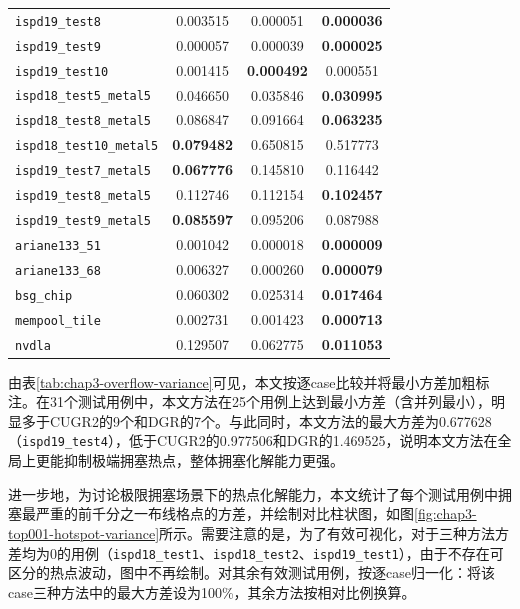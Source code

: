 \begin{table}[!htbp]
{\begin{tabular}{l c c c}
            \texttt{ispd19\_test8} & 0.003515 & 0.000051 & \textbf{0.000036} \\
            \texttt{ispd19\_test9} & 0.000057 & 0.000039 & \textbf{0.000025} \\
            \texttt{ispd19\_test10} & 0.001415 & \textbf{0.000492} & 0.000551 \\
            \texttt{ispd18\_test5\_metal5} & 0.046650 & 0.035846 & \textbf{0.030995} \\
            \texttt{ispd18\_test8\_metal5} & 0.086847 & 0.091664 & \textbf{0.063235} \\
            \texttt{ispd18\_test10\_metal5} & \textbf{0.079482} & 0.650815 & 0.517773 \\
            \texttt{ispd19\_test7\_metal5} & \textbf{0.067776} & 0.145810 & 0.116442 \\
            \texttt{ispd19\_test8\_metal5} & 0.112746 & 0.112154 & \textbf{0.102457} \\
            \texttt{ispd19\_test9\_metal5} & \textbf{0.085597} & 0.095206 & 0.087988 \\
            \texttt{ariane133\_51} & 0.001042 & 0.000018 & \textbf{0.000009} \\
            \texttt{ariane133\_68} & 0.006327 & 0.000260 & \textbf{0.000079} \\
            \texttt{bsg\_chip} & 0.060302 & 0.025314 & \textbf{0.017464} \\
            \texttt{mempool\_tile} & 0.002731 & 0.001423 & \textbf{0.000713} \\
            \texttt{nvdla} & 0.129507 & 0.062775 & \textbf{0.011053} \\
            \hline
        \end{tabular}
    }
\end{table}

由表\ref{tab:chap3-overflow-variance}可见，本文按逐case比较并将最小方差加粗标注。在31个测试用例中，本文方法在25个用例上达到最小方差（含并列最小），明显多于CUGR2的9个和DGR的7个。与此同时，本文方法的最大方差为0.677628（\texttt{ispd19\_test4}），低于CUGR2的0.977506和DGR的1.469525，说明本文方法在全局上更能抑制极端拥塞热点，整体拥塞化解能力更强。

进一步地，为讨论极限拥塞场景下的热点化解能力，本文统计了每个测试用例中拥塞最严重的前千分之一布线格点的方差，并绘制对比柱状图，如图\ref{fig:chap3-top001-hotspot-variance}所示。需要注意的是，为了有效可视化，对于三种方法方差均为0的用例（\texttt{ispd18\_test1}、\texttt{ispd18\_test2}、\texttt{ispd19\_test1}），由于不存在可区分的热点波动，图中不再绘制。对其余有效测试用例，按逐case归一化：将该case三种方法中的最大方差设为100\%，其余方法按相对比例换算。

